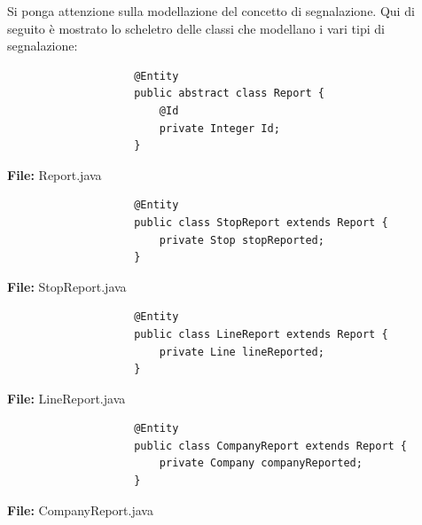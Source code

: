         Si ponga attenzione sulla modellazione del concetto di segnalazione. Qui di seguito è mostrato lo scheletro delle classi che modellano i vari tipi di segnalazione:
        
        \begin{framed}
            \begin{code}
                \begin{verbatim}
                    @Entity
                    public abstract class Report {
                        @Id 
                        private Integer Id;
                    }
                \end{verbatim}
                \caption{\textbf{File:} Report.java}
            \end{code}
        \end{framed}
        \begin{framed}
            \begin{code}
                \begin{verbatim}
                    @Entity
                    public class StopReport extends Report {        
                        private Stop stopReported;
                    }
                \end{verbatim}  
                \caption{\textbf{File:} StopReport.java}
            \end{code}
        \end{framed}
        \begin{framed}
            \begin{code}
                \begin{verbatim}
                    @Entity
                    public class LineReport extends Report {        
                        private Line lineReported;
                    }
                \end{verbatim}  
                \caption{\textbf{File:} LineReport.java}
            \end{code}
        \end{framed}
        \begin{framed}
            \begin{code}
                \begin{verbatim}
                    @Entity
                    public class CompanyReport extends Report {        
                        private Company companyReported;
                    }
                \end{verbatim}  
                \caption{\textbf{File:} CompanyReport.java}
            \end{code}
        \end{framed}
